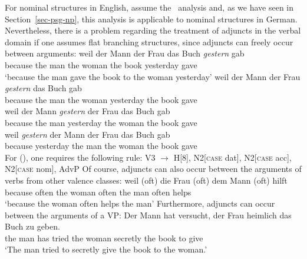 For nominal structures in English, \citet[]{GKPS85a} assume the \xbar~analysis and, as we have seen in Section~\ref{sec-psg-np}, this analysis is applicable
to nominal structures in German. Nevertheless, there is a problem regarding the treatment of adjuncts in the verbal domain if one assumes flat branching structures, since adjuncts can
freely occur between arguments:
\eal
\ex 
\gll weil der Mann der Frau das Buch \emph{gestern} gab\\
	 because the man the woman the book yesterday gave\\
\glt `because the man gave the book to the woman yesterday'
\ex 
\gll weil der Mann der Frau \emph{gestern} das Buch gab\\
	 because the man the woman yesterday the book gave\\
\ex 
\gll weil der Mann \emph{gestern} der Frau das Buch gab\\
	 because the man yesterday the woman the book gave\\
\ex 
\gll weil \emph{gestern} der Mann der Frau das Buch gab\\
	 because yesterday the man the woman the book gave\\
\zl
For (), one requires the following rule:
\ea
\label{regel-ditransitiv-adv}
V3  $\to$ H[8], N2[\textsc{case} dat], N2[\textsc{case} acc], N2[\textsc{case} nom], AdvP
\z
Of course, adjuncts can also occur between the arguments of verbs from other valence classes:
\ea
\gll weil (oft) die Frau (oft) dem Mann (oft) hilft\\
	because \spacebr{}often the woman \spacebr{}often the man \spacebr{}often helps\\
\glt `because the woman often helps the man'
\z
Furthermore, adjuncts can occur between the arguments of a VP:
\ea
\gll Der Mann hat versucht, der Frau heimlich das Buch zu geben.\\
	the man has tried the woman secretly the book to give\\
\glt `The man tried to secretly give the book to the woman.'
\z 

